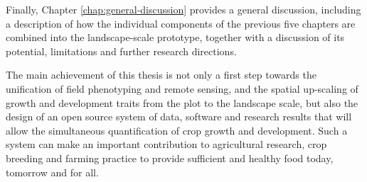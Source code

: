 Finally, Chapter \ref{chap:general-discussion} provides a general discussion, including a description of how the individual components of the previous five chapters are combined into the landscape-scale prototype, together with a discussion of its potential, limitations and further research directions.

The main achievement of this thesis is not only a first step towards the unification of field phenotyping and remote sensing, and the spatial up-scaling of growth and development traits from the plot to the landscape scale, but also the design of an open source system of data, software and research results that will allow the simultaneous quantification of crop growth and development. Such a system can make an important contribution to agricultural research, crop breeding and farming practice to provide sufficient and healthy food today, tomorrow and for all.